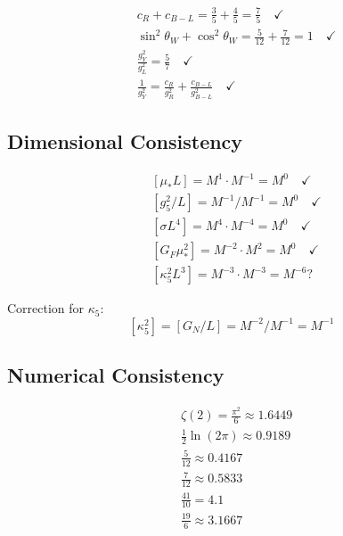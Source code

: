 \documentclass[11pt,a4paper]{article}
\theoremstyle{definition}
\begin{document}
\begin{align}
\label{eq:consist_1}
&c_R + c_{B-L} = \frac{3}{5} + \frac{4}{5} = \frac{7}{5} \quad \checkmark \\
\label{eq:consist_2}
&\sin^2\theta_W + \cos^2\theta_W = \frac{5}{12} + \frac{7}{12} = 1 \quad \checkmark \\
\label{eq:consist_3}
&\frac{g_Y^2}{g_L^2} = \frac{5}{7} \quad \checkmark \\
\label{eq:consist_4}
&\frac{1}{g_Y^2} = \frac{c_R}{g_R^2} + \frac{c_{B-L}}{g_{B-L}^2} \quad \checkmark
\end{align}

\subsection{Dimensional Consistency}
\label{subsec:dim_consist}

\begin{align}
\label{eq:dim_consist_1}
&[\mu_* L] = M^1 \cdot M^{-1} = M^0 \quad \checkmark \\
\label{eq:dim_consist_2}
&[g_5^2/L] = M^{-1}/M^{-1} = M^0 \quad \checkmark \\
\label{eq:dim_consist_3}
&[\sigma L^4] = M^4 \cdot M^{-4} = M^0 \quad \checkmark \\
\label{eq:dim_consist_4}
&[G_F\mu_*^2] = M^{-2} \cdot M^2 = M^0 \quad \checkmark \\
\label{eq:dim_consist_5}
&[\kappa_5^2 L^3] = M^{-3} \cdot M^{-3} = M^{-6}?
\end{align}

Correction for $\kappa_5$:
\begin{equation}
\label{eq:dim_consist_6}
[\kappa_5^2] = [G_N/L] = M^{-2}/M^{-1} = M^{-1}
\end{equation}

\subsection{Numerical Consistency}
\label{subsec:num_consist}

\begin{align}
\label{eq:num_consist_1}
&\zeta(2) = \frac{\pi^2}{6} \approx 1.6449 \\
\label{eq:num_consist_2}
&\frac{1}{2}\ln(2\pi) \approx 0.9189 \\
\label{eq:num_consist_3}
&\frac{5}{12} \approx 0.4167 \\
\label{eq:num_consist_4}
&\frac{7}{12} \approx 0.5833 \\
\label{eq:num_consist_5}
&\frac{41}{10} = 4.1 \\
\label{eq:num_consist_6}
&\frac{19}{6} \approx 3.1667
\end{align}
\end{document}

